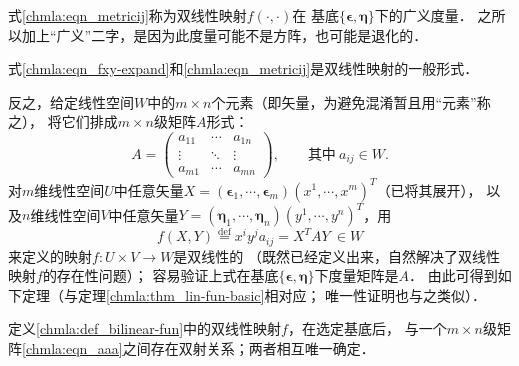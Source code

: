式\eqref{chmla:eqn_metricij}称为双线性映射$f(\cdot,\cdot)$在
基底$\{\boldsymbol{\epsilon},\boldsymbol{\eta}\}$下的{\heiti 广义度量}．
之所以加上“广义”二字，是因为此度量可能不是方阵，也可能是退化的．



式\eqref{chmla:eqn_fxy-expand}和\eqref{chmla:eqn_metricij}是双线性映射的一般形式．

反之，给定线性空间$W$中的$m\times n$个元素（即矢量，为避免混淆暂且用“元素”称之），
将它们排成$m\times n$级矩阵$A$形式：
\begin{equation}
    A = \begin{pmatrix}\label{chmla:eqn_aaa}
        a_{11} & \cdots & a_{1n} \\
        \vdots & \ddots & \vdots \\
        a_{m1} & \cdots & a_{mn}
    \end{pmatrix},
    \qquad \text{其中}\ a_{ij}\in W .
\end{equation}
对$m$维线性空间$U$中任意矢量$X=(\boldsymbol{\epsilon}_1, \cdots,
\boldsymbol{\epsilon}_m) (x^1,\cdots,x^m)^T$（已将其展开），
以及$n$维线性空间$V$中任意矢量$Y=(\boldsymbol{\eta}_1, \cdots,
\boldsymbol{\eta}_n) (y^1,\cdots,y^n)^T$，用
\begin{equation}\label{chmla:eqn_bi-fun-form}
    f(X,Y) \overset{\mathrm {def}}{=} x^i y^j a_{ij} = X^T A Y \ \in W
\end{equation}
来定义的映射$f:U \times V \to W $是双线性的
（既然已经定义出来，自然解决了双线性映射$f$的存在性问题）；
容易验证上式在基底$\{\boldsymbol{\epsilon},\boldsymbol{\eta}\}$下度量矩阵是$A$．
由此可得到如下定理（与定理\ref{chmla:thm_lin-fun-basic}相对应；
唯一性证明也与之类似）．

\begin{theorem}\label{chmla:thm_bifunmatrix}
定义\ref{chmla:def_bilinear-fun}中的双线性映射$f$，在选定基底后，
与一个$m\times n$级矩阵\eqref{chmla:eqn_aaa}之间存在双射关系；两者相互唯一确定．
\end{theorem}

